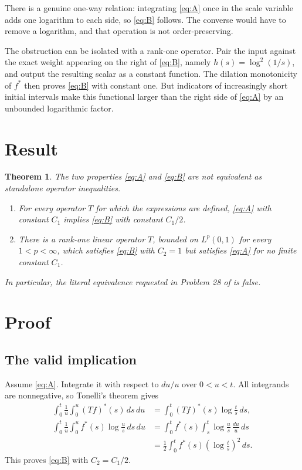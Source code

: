 \documentclass[11pt]{article}
\newtheorem{theorem}{Theorem}
\begin{document}
There is a genuine one-way relation: integrating \eqref{eq:A} once in the
scale variable adds one logarithm to each side, so \eqref{eq:B} follows.
The converse would have to remove a logarithm, and that operation is not
order-preserving.

The obstruction can be isolated with a rank-one operator.  Pair the input
against the exact weight appearing on the right of \eqref{eq:B}, namely
$h(s)=\log^2(1/s)$, and output the resulting scalar as a constant function.
The dilation monotonicity of $f^*$ then proves \eqref{eq:B} with constant one.
But indicators of increasingly short initial intervals make this functional
larger than the right side of \eqref{eq:A} by an unbounded logarithmic factor.

\section{Result}

\begin{theorem}\label{thm:main}
The two properties \eqref{eq:A} and \eqref{eq:B} are not equivalent as
standalone operator inequalities.
\begin{enumerate}
\item For every operator $T$ for which the expressions are defined,
      \eqref{eq:A} with constant $C_1$ implies \eqref{eq:B} with constant
      $C_1/2$.
\item There is a rank-one linear operator $T$, bounded on $L^p(0,1)$ for
      every $1<p<\infty$, which satisfies \eqref{eq:B} with $C_2=1$ but
      satisfies \eqref{eq:A} for no finite constant $C_1$.
\end{enumerate}
In particular, the literal equivalence requested in Problem 28 of
\cite{AM} is false.
\end{theorem}

\section{Proof}

\subsection{The valid implication}

Assume \eqref{eq:A}.  Integrate it with respect to $du/u$ over $0<u<t$.
All integrands are nonnegative, so Tonelli's theorem gives
\begin{align*}
 \int_0^t \frac1u\int_0^u (Tf)^*(s)\,ds\,du
 &=\int_0^t (Tf)^*(s)\log\frac ts\,ds,\\
 \int_0^t \frac1u\int_0^u f^*(s)\log\frac us\,ds\,du
 &=\int_0^t f^*(s)\int_s^t\log\frac us\,\frac{du}{u}\,ds\\
 &=\frac12\int_0^t f^*(s)\left(\log\frac ts\right)^2\,ds.
\end{align*}
This proves \eqref{eq:B} with $C_2=C_1/2$.
\end{document}
